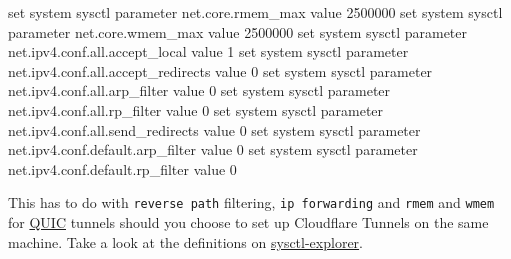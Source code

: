 \documentclass[
]{article}
\newenvironment{Shaded}{\begin{snugshade}}{\end{snugshade}}
\newcommand{\BuiltInTok}[1]{#1}
\newcommand{\NormalTok}[1]{#1}
\newcommand{\StringTok}[1]{\textcolor[rgb]{0.31,0.60,0.02}{#1}}
\begin{document}
\begin{Shaded}
\begin{Highlighting}[numbers=left,,]
\BuiltInTok{set}\NormalTok{ system sysctl parameter net.core.rmem\_max value }\StringTok{\textquotesingle{}2500000\textquotesingle{}}
\BuiltInTok{set}\NormalTok{ system sysctl parameter net.core.wmem\_max value }\StringTok{\textquotesingle{}2500000\textquotesingle{}}
\BuiltInTok{set}\NormalTok{ system sysctl parameter net.ipv4.conf.all.accept\_local value }\StringTok{\textquotesingle{}1\textquotesingle{}}
\BuiltInTok{set}\NormalTok{ system sysctl parameter net.ipv4.conf.all.accept\_redirects value }\StringTok{\textquotesingle{}0\textquotesingle{}}
\BuiltInTok{set}\NormalTok{ system sysctl parameter net.ipv4.conf.all.arp\_filter value }\StringTok{\textquotesingle{}0\textquotesingle{}}
\BuiltInTok{set}\NormalTok{ system sysctl parameter net.ipv4.conf.all.rp\_filter value }\StringTok{\textquotesingle{}0\textquotesingle{}}
\BuiltInTok{set}\NormalTok{ system sysctl parameter net.ipv4.conf.all.send\_redirects value }\StringTok{\textquotesingle{}0\textquotesingle{}}
\BuiltInTok{set}\NormalTok{ system sysctl parameter net.ipv4.conf.default.arp\_filter value }\StringTok{\textquotesingle{}0\textquotesingle{}}
\BuiltInTok{set}\NormalTok{ system sysctl parameter net.ipv4.conf.default.rp\_filter value }\StringTok{\textquotesingle{}0\textquotesingle{}}
\end{Highlighting}
\end{Shaded}

This has to do with \texttt{reverse\ path} filtering,
\texttt{ip\ forwarding} and \texttt{rmem} and \texttt{wmem} for
\href{https://github.com/quic-go/quic-go/wiki/UDP-Buffer-Sizes}{QUIC}
tunnels should you choose to set up Cloudflare Tunnels on the same
machine. Take a look at the definitions on
\href{https://sysctl-explorer.net/}{sysctl-explorer}.
\end{document}
